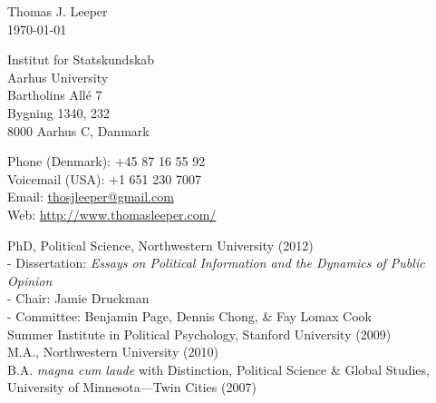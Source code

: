 \documentclass[12pt]{article}
\renewcommand{\section}[1]{\pagebreak[3]%
    \llap{\scshape\smash{\parbox[t]{\marginparwidth}{\raggedright {\color{lg}#1}}}}%
    \vspace{-\baselineskip}\par}
\newcommand{\entry}[1]{\indent {\color{lg}\guillemotright}\hspace{2pt}#1\vspace{.25em}\\}
\newcommand{\subentry}[1]{{\color{lg}-} #1\vspace{.25em}\\}
\begin{document}
{\LARGE Thomas J. Leeper}\\

\today\\

\begin{minipage}[b]{0.5\linewidth}
Institut for Statskundskab\\
Aarhus University\\
Bartholins All\'{e} 7\\
Bygning 1340, 232\\
8000 Aarhus C, Danmark\\
\end{minipage}
\begin{minipage}[b]{0.5\linewidth}
Phone (Denmark): +45 87 16 55 92\\ 
Voicemail (USA): +1 651 230 7007\\
Email: \href{mailto:thosjleeper@gmail.com}{thosjleeper@gmail.com}\\
Web: \href{http://www.thomasleeper.com/}{http://www.thomasleeper.com/}\\
\end{minipage}

\section{Education}
\entry{PhD, Political Science, Northwestern University (2012)}
\subentry{Dissertation: {\em Essays on Political Information and the Dynamics of Public Opinion}}
\subentry{Chair: Jamie Druckman}
\subentry{Committee: Benjamin Page, Dennis Chong, \& Fay Lomax Cook}
\entry{Summer Institute in Political Psychology, Stanford University (2009)}
\entry{M.A., Northwestern University (2010)}
\entry{B.A. {\em magna cum laude} with Distinction, Political Science \& Global Studies, University of Minnesota---Twin Cities (2007)}
\end{document}
